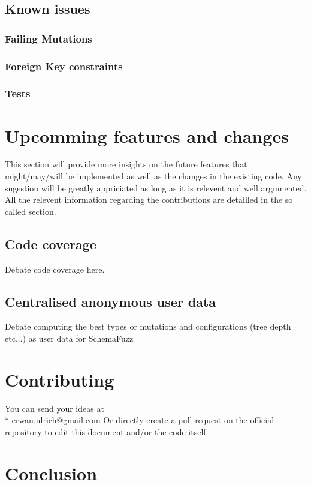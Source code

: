 \documentclass{article}
\begin{document}
		\subsection{Known issues}		
			\subsubsection{Failing Mutations}
			\subsubsection{Foreign Key constraints}
			\subsubsection{Tests}
	\section{Upcomming features and changes}
This section will provide more insights on the future features that might/may/will be implemented as well as the changes in the existing code.
Any sugestion will be greatly appriciated as long as it is relevent and well argumented. All the relevent information regarding the contributions are detailled in the so called section.
	
		\subsection{Code coverage}
Debate code coverage here.
		\subsection{Centralised anonymous user data}
Debate computing the best types or mutations and configurations (tree depth etc...) as user data for SchemaFuzz
		
	\section{Contributing}
You can send your ideas at  \\*
		\url{erwan.ulrich@gmail.com}
Or directly create a pull request on the official repository to edit this document and/or the code itself
	\section{Conclusion}
\end{document}
